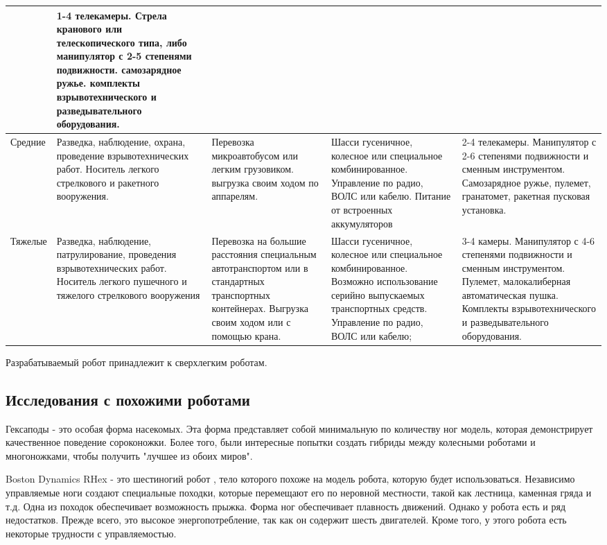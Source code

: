 \begin{small}
\begin{center}
\begin{longtable}[H]{|p{2cm}|p{3cm}|p{3cm}|p{3.2cm}|p{3cm}|}
&
1-4 телекамеры. Стрела кранового или телескопического типа, либо манипулятор с 2-5 степенями подвижности. самозарядное ружье. комплекты взрывотехнического и разведывательного оборудования. \\ 
\hline 
\normalsize{Средние} 
&
Разведка, наблюдение, охрана, проведение взрывотехнических работ. Носитель легкого стрелкового и ракетного вооружения.
&
Перевозка микроавтобусом или легким грузовиком. выгрузка своим ходом по аппарелям.
&
Шасси гусеничное, колесное или специальное комбинированное. Управление по радио, ВОЛС или кабелю. Питание от встроенных аккумуляторов 
&
2-4 телекамеры. Манипулятор с 2-6 степенями подвижности и сменным инструментом. Самозарядное ружье, пулемет, гранатомет, ракетная пусковая установка. \\ 
\hline 
\normalsize{Тяжелые}
&
Разведка, наблюдение, патрулирование, проведения взрывотехнических работ. Носитель легкого пушечного и тяжелого стрелкового вооружения
&
Перевозка на большие расстояния специальным автотранспортом или в стандартных транспортных контейнерах. Выгрузка своим ходом или с помощью крана.
&
Шасси гусеничное, колесное или специальное комбинированное. Возможно использование серийно выпускаемых транспортных средств. Управление по радио, ВОЛС или кабелю;  
&
3-4 камеры. Манипулятор с 4-6 степенями подвижности и сменным инструментом. Пулемет, малокалиберная автоматическая пушка. Комплекты взрывотехнического и разведывательного оборудования. \\  
\hline 
\end{longtable}
\end{center}
\end{small}

Разрабатываемый робот принадлежит к сверхлегким роботам.

\subsection{Исследования с похожими роботами}
Гексаподы - это особая форма насекомых. Эта форма представляет собой минимальную по количеству ног модель, которая демонстрирует качественное поведение сороконожки. Более того, были интересные попытки создать гибриды между колесными роботами и многоножками, чтобы получить "лучшее из обоих миров".

Boston Dynamics RHex \cite{altendorfer2001rhex} - это шестиногий робот , тело которого похоже на модель робота, которую будет использоваться. Независимо управляемые ноги создают специальные походки, которые перемещают его по неровной местности, такой как лестница, каменная гряда и т.д. Одна из походок обеспечивает возможность прыжка. Форма ног обеспечивает плавность движений. Однако у робота есть и ряд недостатков. Прежде всего, это высокое энергопотребление, так как он содержит шесть двигателей. Кроме того, у этого робота есть некоторые трудности с управляемостью. 

